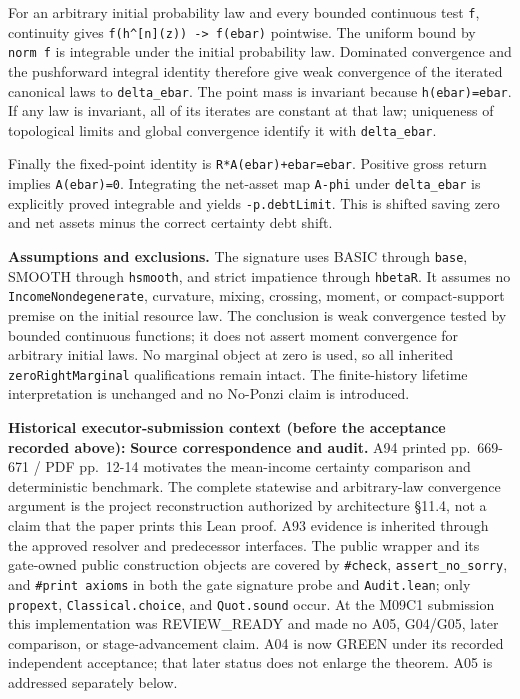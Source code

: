 \documentclass[
  11pt,
]{article}
\let\LedgerOriginalTexttt\texttt
\renewcommand{\texttt}[1]{{\small\LedgerOriginalTexttt{#1}}}
\begin{document}
For an arbitrary initial probability law and every bounded continuous
test \texttt{f}, continuity gives
\texttt{f(h\^{}{[}n{]}(z))\ -\textgreater{}\ f(ebar)} pointwise. The
uniform bound by \texttt{norm\ f} is integrable under the initial
probability law. Dominated convergence and the pushforward integral
identity therefore give weak convergence of the iterated canonical laws
to \texttt{delta\_ebar}. The point mass is invariant because
\texttt{h(ebar)=ebar}. If any law is invariant, all of its iterates are
constant at that law; uniqueness of topological limits and global
convergence identify it with \texttt{delta\_ebar}.

Finally the fixed-point identity is \texttt{R*A(ebar)+ebar=ebar}.
Positive gross return implies \texttt{A(ebar)=0}. Integrating the
net-asset map \texttt{A-phi} under \texttt{delta\_ebar} is explicitly
proved integrable and yields \texttt{-p.debtLimit}. This is shifted
saving zero and net assets minus the correct certainty debt shift.

\textbf{Assumptions and exclusions.} The signature uses BASIC through
\texttt{base}, SMOOTH through \texttt{hsmooth}, and strict impatience
through \texttt{hbetaR}. It assumes no \texttt{IncomeNondegenerate},
curvature, mixing, crossing, moment, or compact-support premise on the
initial resource law. The conclusion is weak convergence tested by
bounded continuous functions; it does not assert moment convergence for
arbitrary initial laws. No marginal object at zero is used, so all
inherited \texttt{zeroRightMarginal} qualifications remain intact. The
finite-history lifetime interpretation is unchanged and no No-Ponzi
claim is introduced.

\textbf{Historical executor-submission context (before the acceptance
recorded above):} \textbf{Source correspondence and audit.} A94 printed
pp.~669-671 / PDF pp.~12-14 motivates the mean-income certainty
comparison and deterministic benchmark. The complete statewise and
arbitrary-law convergence argument is the project reconstruction
authorized by architecture §11.4, not a claim that the paper prints this
Lean proof. A93 evidence is inherited through the approved resolver and
predecessor interfaces. The public wrapper and its gate-owned public
construction objects are covered by \texttt{\#check},
\texttt{assert\_no\_sorry}, and \texttt{\#print\ axioms} in both the
gate signature probe and \texttt{Audit.lean}; only \texttt{propext},
\texttt{Classical.choice}, and \texttt{Quot.sound} occur. At the M09C1
submission this implementation was REVIEW\_READY and made no A05,
G04/G05, later comparison, or stage-advancement claim. A04 is now GREEN
under its recorded independent acceptance; that later status does not
enlarge the theorem. A05 is addressed separately below.
\end{document}
